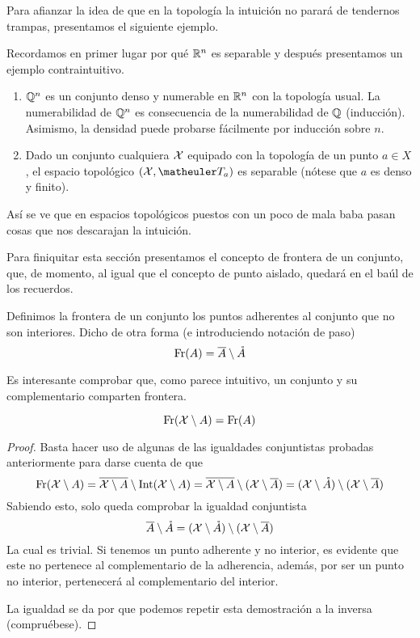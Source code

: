 Para afianzar la idea de que en la topología la intuición no parará de tendernos trampas, presentamos el siguiente ejemplo.
\begin{exa}
	Recordamos en primer lugar por qué $\mathbb{R}^n$ es separable y después presentamos un ejemplo contraintuitivo.
	\begin{enumerate}
		\item $\mathbb{Q}^n$ es un conjunto denso y numerable en $\mathbb{R}^n$ con la topología usual. La numerabilidad de $\mathbb{Q}^n$ es consecuencia de la numerabilidad de $\mathbb{Q}$ (inducción). Asimismo, la densidad puede probarse fácilmente por inducción sobre $n$.
		\item Dado un conjunto cualquiera $\mathcal{X}$ equipado con la topología de un punto $a\in X$, el espacio topológico $(\X,\T_a)$ es separable (nótese que $a$ es denso y finito).
	\end{enumerate}
	Así se ve que en espacios topológicos puestos con un poco de mala baba pasan cosas que nos descarajan la intuición.
\end{exa}
Para finiquitar esta sección presentamos el concepto de frontera de un conjunto, que, de momento, al igual que el concepto de punto aislado, quedará en el baúl de los recuerdos.
\begin{defi}
	Definimos la frontera de un conjunto los puntos adherentes al conjunto que no son interiores. Dicho de otra forma (e introduciendo notación de paso)
	\begin{equation}
	\operatorname{\mathrm{Fr}}(A)=\overline{A}\setminus\mathring{A}
	\end{equation}
\end{defi}
Es interesante comprobar que, como parece intuitivo, un conjunto y su complementario comparten frontera.
\begin{lem}
	\begin{equation*}
		\operatorname{\mathrm{Fr}}(\mathcal{X} \setminus A)=\operatorname{\mathrm{Fr}}(A)
	\end{equation*}
\end{lem}
\begin{proof}
	Basta hacer uso de algunas de las igualdades conjuntistas probadas anteriormente para darse cuenta de que
	\begin{equation*}
		\operatorname{\mathrm{Fr}}(\mathcal{X} \setminus A)=\overline{\mathcal{X} \setminus A}\setminus \operatorname{\mathrm{Int}}(\mathcal{X} \setminus A)=\overline{\mathcal{X} \setminus A}\setminus (\mathcal{X}\setminus \overline{A})=(\mathcal{X}\setminus\mathring{A})\setminus (\mathcal{X}\setminus \overline{A})
	\end{equation*}
	Sabiendo esto, solo queda comprobar la igualdad conjuntista
	\begin{equation*}
		\overline{A}\setminus\mathring{A}=(\mathcal{X}\setminus\mathring{A})\setminus (\mathcal{X}\setminus \overline{A})
	\end{equation*}
	La cual es trivial. Si tenemos un punto adherente y no interior, es evidente que este no pertenece al complementario de la adherencia, además, por ser un punto no interior, pertenecerá al complementario del interior.
	
	La igualdad se da por que podemos repetir esta demostración a la inversa (compruébese). 
\end{proof}

